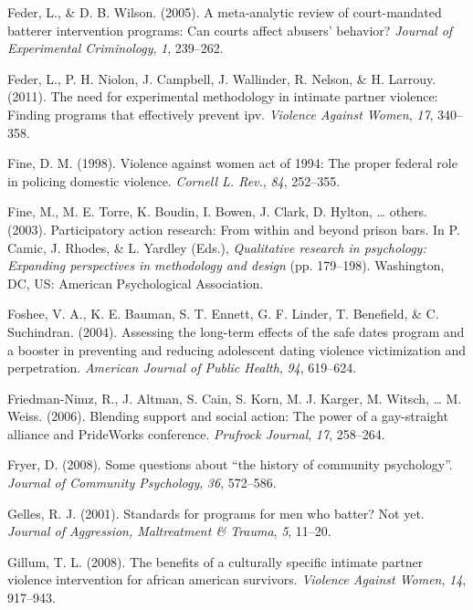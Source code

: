 \documentclass[11pt,]{tufte-book}
\begin{document}
\hypertarget{ref-feder2005meta}{}
Feder, L., \& D. B. Wilson. (2005). A meta-analytic review of
court-mandated batterer intervention programs: Can courts affect
abusers' behavior? \emph{Journal of Experimental Criminology}, \emph{1},
239--262.

\hypertarget{ref-feder2011need}{}
Feder, L., P. H. Niolon, J. Campbell, J. Wallinder, R. Nelson, \& H.
Larrouy. (2011). The need for experimental methodology in intimate
partner violence: Finding programs that effectively prevent ipv.
\emph{Violence Against Women}, \emph{17}, 340--358.

\hypertarget{ref-fine1998violence}{}
Fine, D. M. (1998). Violence against women act of 1994: The proper
federal role in policing domestic violence. \emph{Cornell L. Rev.},
\emph{84}, 252--355.

\hypertarget{ref-fine2003participatory}{}
Fine, M., M. E. Torre, K. Boudin, I. Bowen, J. Clark, D. Hylton,
\ldots{} others. (2003). Participatory action research: From within and
beyond prison bars. In P. Camic, J. Rhodes, \& L. Yardley (Eds.),
\emph{Qualitative research in psychology: Expanding perspectives in
methodology and design} (pp. 179--198). Washington, DC, US: American
Psychological Association.

\hypertarget{ref-foshee2004assessing}{}
Foshee, V. A., K. E. Bauman, S. T. Ennett, G. F. Linder, T. Benefield,
\& C. Suchindran. (2004). Assessing the long-term effects of the safe
dates program and a booster in preventing and reducing adolescent dating
violence victimization and perpetration. \emph{American Journal of
Public Health}, \emph{94}, 619--624.

\hypertarget{ref-friedman-nimz2006blending}{}
Friedman-Nimz, R., J. Altman, S. Cain, S. Korn, M. J. Karger, M. Witsch,
\ldots{} M. Weiss. (2006). Blending support and social action: The power
of a gay-straight alliance and PrideWorks conference. \emph{Prufrock
Journal}, \emph{17}, 258--264.

\hypertarget{ref-fryer2008some}{}
Fryer, D. (2008). Some questions about ``the history of community
psychology''. \emph{Journal of Community Psychology}, \emph{36},
572--586.

\hypertarget{ref-gelles2001standards}{}
Gelles, R. J. (2001). Standards for programs for men who batter? Not
yet. \emph{Journal of Aggression, Maltreatment \& Trauma}, \emph{5},
11--20.

\hypertarget{ref-gillum2008benefits}{}
Gillum, T. L. (2008). The benefits of a culturally specific intimate
partner violence intervention for african american survivors.
\emph{Violence Against Women}, \emph{14}, 917--943.
\end{document}
